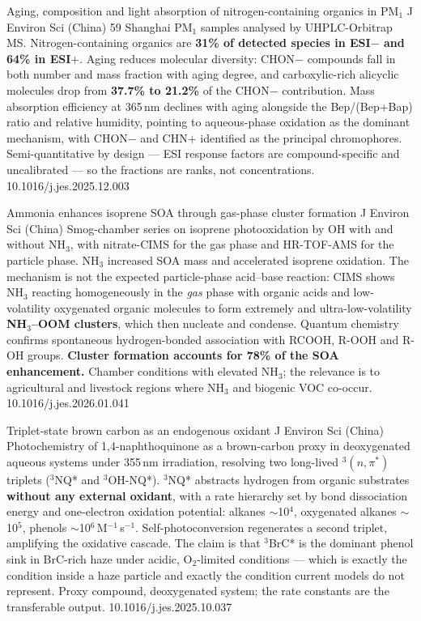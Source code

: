 \documentclass[10pt]{article}
\begin{document}
{Aging, composition and light absorption of nitrogen-containing organics in PM$_1$}
{J Environ Sci (China)}
{59 Shanghai PM$_1$ samples analysed by UHPLC-Orbitrap MS. Nitrogen-containing organics
are \textbf{31\% of detected species in ESI$-$ and 64\% in ESI$+$}. Aging reduces
molecular diversity: CHON$-$ compounds fall in both number and mass fraction with aging
degree, and carboxylic-rich alicyclic molecules drop from \textbf{37.7\% to 21.2\%} of the
CHON$-$ contribution. Mass absorption efficiency at 365\,nm declines with aging alongside
the Bep/(Bep+Bap) ratio and relative humidity, pointing to aqueous-phase oxidation as the
dominant mechanism, with CHON$-$ and CHN$+$ identified as the principal chromophores.
Semi-quantitative by design --- ESI response factors are compound-specific and
uncalibrated --- so the fractions are ranks, not concentrations.}
{10.1016/j.jes.2025.12.003}

{Ammonia enhances isoprene SOA through gas-phase cluster formation}
{J Environ Sci (China)}
{Smog-chamber series on isoprene photooxidation by OH with and without NH$_3$, with
nitrate-CIMS for the gas phase and HR-TOF-AMS for the particle phase. NH$_3$ increased
SOA mass and accelerated isoprene oxidation. The mechanism is not the expected
particle-phase acid--base reaction: CIMS shows NH$_3$ reacting homogeneously in the
\emph{gas} phase with organic acids and low-volatility oxygenated organic molecules to
form extremely and ultra-low-volatility \textbf{NH$_3$--OOM clusters}, which then nucleate
and condense. Quantum chemistry confirms spontaneous hydrogen-bonded association with
RCOOH, R-OOH and R-OH groups. \textbf{Cluster formation accounts for 78\% of the SOA
enhancement.} Chamber conditions with elevated NH$_3$; the relevance is to agricultural
and livestock regions where NH$_3$ and biogenic VOC co-occur.}
{10.1016/j.jes.2026.01.041}

{Triplet-state brown carbon as an endogenous oxidant}
{J Environ Sci (China)}
{Photochemistry of 1,4-naphthoquinone as a brown-carbon proxy in deoxygenated aqueous
systems under 355\,nm irradiation, resolving two long-lived $^3(n,\pi^*)$ triplets
($^3$NQ* and $^3$OH-NQ*). $^3$NQ* abstracts hydrogen from organic substrates
\textbf{without any external oxidant}, with a rate hierarchy set by bond dissociation
energy and one-electron oxidation potential: alkanes $\sim$10$^4$, oxygenated alkanes
$\sim$10$^5$, phenols $\sim$10$^6$\,M$^{-1}$\,s$^{-1}$. Self-photoconversion regenerates
a second triplet, amplifying the oxidative cascade. The claim is that
$^3$BrC* is the dominant phenol sink in BrC-rich haze under acidic, O$_2$-limited
conditions --- which is exactly the condition inside a haze particle and exactly the
condition current models do not represent. Proxy compound, deoxygenated system; the
rate constants are the transferable output.}
{10.1016/j.jes.2025.10.037}
\end{document}
